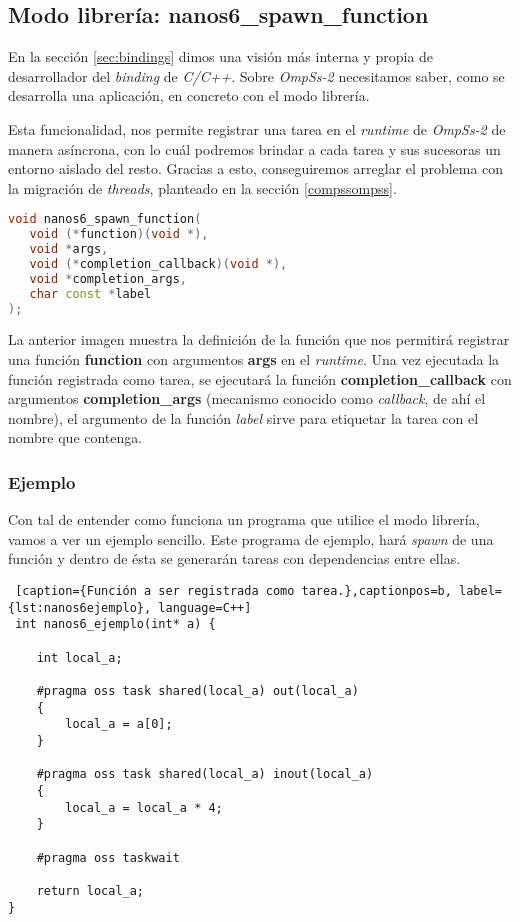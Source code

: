 \subsection{Modo librería: nanos6\_spawn\_function \label{spawnfunction}}

En la sección \ref{sec:bindings} dimos una visión más interna y propia de desarrollador del \textit{binding} de \textit{C/C++}. Sobre \textit{OmpSs-2} necesitamos saber, como se desarrolla una aplicación, en concreto con el modo librería.
\medskip

Esta funcionalidad, nos permite registrar una tarea en el \textit{runtime} de \textit{OmpSs-2} de manera asíncrona, con lo cuál podremos brindar a cada tarea y sus sucesoras un entorno aislado del resto. Gracias a esto, conseguiremos arreglar el problema con la migración de \textit{threads}, planteado en la sección \ref{compssompss}. \smallskip

\begin{lstlisting}[caption={Definición de la función nanos6\_spawn\_function.},captionpos=b, label={lst:nanos6spawn}, language=C++]
void nanos6_spawn_function(
   void (*function)(void *), 
   void *args,
   void (*completion_callback)(void *), 
   void *completion_args, 
   char const *label
);
\end{lstlisting}

La anterior imagen muestra la definición de la función que nos permitirá registrar una función \textbf{function} con argumentos \textbf{args} en el \textit{runtime}. Una vez ejecutada la función registrada como tarea, se ejecutará la función \textbf{completion\_callback} con argumentos \textbf{completion\_args} (mecanismo conocido como \textit{callback}, de ahí el nombre), el argumento de la función \textit{label} sirve para etiquetar la tarea con el nombre que contenga.

\subsubsection{Ejemplo}
\label{sec:ejemplo}

Con tal de entender como funciona un programa que utilice el modo librería, vamos a ver un ejemplo sencillo. Este programa de ejemplo, hará \textit{spawn} de una función y dentro de ésta se generarán tareas con dependencias entre ellas. \smallskip

\begin{lstlisting} [caption={Función a ser registrada como tarea.},captionpos=b, label={lst:nanos6ejemplo}, language=C++]
 int nanos6_ejemplo(int* a) {

    int local_a;

    #pragma oss task shared(local_a) out(local_a) 
    {
        local_a = a[0];
    }

    #pragma oss task shared(local_a) inout(local_a)
    {
        local_a = local_a * 4;
    }

    #pragma oss taskwait

    return local_a;
}
\end{lstlisting}

